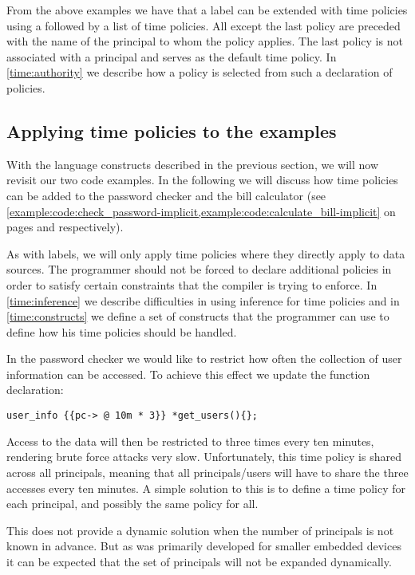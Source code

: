 From the above examples we have that a label can be extended with time policies using a  followed by a list of time policies.
All except the last policy are preceded with the name of the principal to whom the policy applies.
The last policy is not associated with a principal and serves as the default time policy.
In \cref{time:authority} we describe how a policy is selected from such a declaration of policies.

\subsection{Applying time policies to the examples}\label{time:policy_examples}
With the language constructs described in the previous section, we will now revisit our two code examples.
In the following we will discuss how time policies can be added to the password checker and the bill calculator (see \cref{example:code:check_password-implicit,example:code:calculate_bill-implicit} on pages \pageref{example:code:check_password-implicit} and \pageref{example:code:calculate_bill-implicit} respectively).

As with labels, we will only apply time policies where they directly apply to data sources.
The programmer should not be forced to declare additional policies in order to satisfy certain constraints that the compiler is trying to enforce.
In \cref{time:inference} we describe difficulties in using inference for time policies and in \cref{time:constructs} we define a set of constructs that the programmer can use to define how his time policies should be handled.

In the password checker we would like to restrict how often the collection of user information  can be accessed.
To achieve this effect we update the function declaration:

\begin{lstlisting}[style=dlmc]
  user_info {{pc-> @ 10m * 3}} *get_users(){};
\end{lstlisting}

Access to the data will then be restricted to three times every ten minutes, rendering brute force attacks very slow.
Unfortunately, this time policy is shared across all principals, meaning that all principals/users will have to share the three accesses every ten minutes.
A simple solution to this is to define a time policy for each principal, and possibly the same policy for all.

This does not provide a dynamic solution when the number of principals is not known in advance.
But as \thelang{} was primarily developed for smaller embedded devices it can be expected that the set of principals will not be expanded dynamically.

